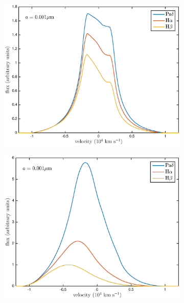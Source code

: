 \begin{figure}
\begin{subfigure}{0.5\textwidth}
\includegraphics[trim =30 31 45 0,clip=true,scale=0.45]{chapters/chapter4/images/dustdep/a0_001_opt_thin_HaHbPad}
\end{subfigure}
\hspace{4mm}
\begin{subfigure}{0.5\textwidth}
\includegraphics[trim =59 31 45 0,clip=true,scale=0.45]{chapters/chapter4/images/dustdep/a0_001_opt_thick_HaHbPad}
\end{subfigure} \\[1ex]


\end{figure}
